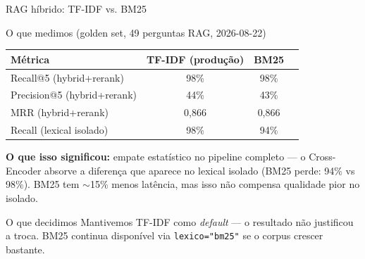 \documentclass{beamer}
\newenvironment{numerobloco}[1]{\begin{block}{#1}}{\end{block}}
\newenvironment{decisaobloco}[1]{\begin{alertblock}{#1}}{\end{alertblock}}
\begin{document}
\begin{frame}{RAG híbrido: TF-IDF vs. BM25}
  \small
  \begin{numerobloco}{O que medimos (golden set, 49 perguntas RAG, 2026-08-22)}
    \begin{center}
    \begin{tabular}{lccc}
      \toprule
      \textbf{Métrica} & \textbf{TF-IDF (produção)} & \textbf{BM25} \\
      \midrule
      Recall@5 (hybrid+rerank) & 98\%   & 98\%   \\
      Precision@5 (hybrid+rerank) & 44\% & 43\%  \\
      MRR (hybrid+rerank)      & 0,866  & 0,866  \\
      Recall (lexical isolado) & 98\%   & 94\%   \\
      \bottomrule
    \end{tabular}
    \end{center}
  \end{numerobloco}

  \pause
  \textbf{O que isso significou:} empate estatístico no pipeline completo — o Cross-Encoder
  absorve a diferença que aparece no lexical isolado (BM25 perde: 94\% vs 98\%). BM25 tem
  $\sim$15\% menos latência, mas isso não compensa qualidade pior no isolado.

  \pause
  \begin{decisaobloco}{O que decidimos}
    Mantivemos TF-IDF como \emph{default} — o resultado não justificou a troca. BM25
    continua disponível via \texttt{lexico="bm25"} se o corpus crescer bastante.
  \end{decisaobloco}
\end{frame}
\end{document}
